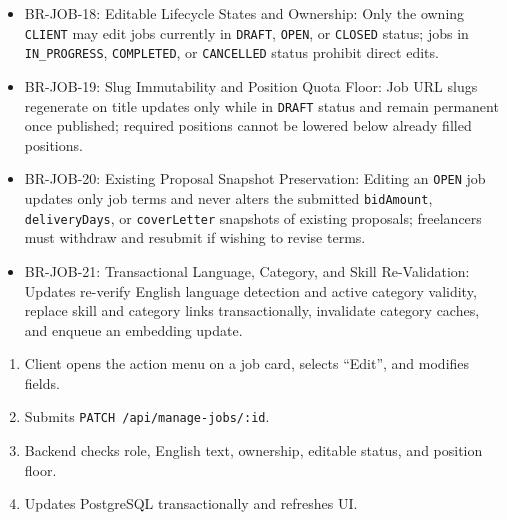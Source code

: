 \begin{itemize}[leftmargin=1.6em,topsep=3pt,itemsep=2pt,parsep=0pt,label=$\bullet$]\brrulelist
    \item BR-JOB-18: Editable Lifecycle States and Ownership: Only the owning \texttt{CLIENT} may edit jobs currently in \texttt{DRAFT}, \texttt{OPEN}, or \texttt{CLOSED} status; jobs in \texttt{IN\_PROGRESS}, \texttt{COMPLETED}, or \texttt{CANCELLED} status prohibit direct edits.
    \item BR-JOB-19: Slug Immutability and Position Quota Floor: Job URL slugs regenerate on title updates only while in \texttt{DRAFT} status and remain permanent once published; required positions cannot be lowered below already filled positions.
    \item BR-JOB-20: Existing Proposal Snapshot Preservation: Editing an \texttt{OPEN} job updates only job terms and never alters the submitted \texttt{bidAmount}, \texttt{deliveryDays}, or \texttt{coverLetter} snapshots of existing proposals; freelancers must withdraw and resubmit if wishing to revise terms.
    \item BR-JOB-21: Transactional Language, Category, and Skill Re-Validation: Updates re-verify English language detection and active category validity, replace skill and category links transactionally, invalidate category caches, and enqueue an embedding update.
\end{itemize}

\begin{enumerate}[leftmargin=1.8em,topsep=3pt,itemsep=2pt,parsep=0pt]
    \item Client opens the action menu on a job card, selects ``Edit'', and modifies fields.
    \item Submits \texttt{PATCH /api/manage-jobs/:id}.
    \item Backend checks role, English text, ownership, editable status, and position floor.
    \item Updates PostgreSQL transactionally and refreshes UI.
\end{enumerate}

